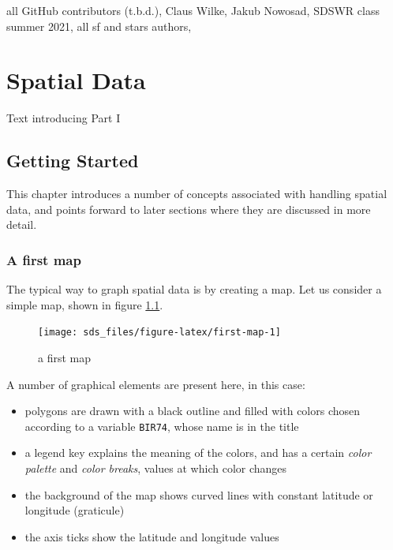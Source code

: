 \documentclass[]{book}
\providecommand{\tightlist}{%
  \setlength{\itemsep}{0pt}\setlength{\parskip}{0pt}}
\begin{document}
all GitHub contributors (t.b.d.),
Claus Wilke,
Jakub Nowosad,
SDSWR class summer 2021,
all sf and stars authors,

\hypertarget{part-spatial-data}{%
\part{Spatial Data}\label{part-spatial-data}}

Text introducing Part I

\hypertarget{intro}{%
\chapter{Getting Started}\label{intro}}

This chapter introduces a number of concepts associated with
handling spatial data, and points forward to later sections where
they are discussed in more detail.

\hypertarget{a-first-map}{%
\section{A first map}\label{a-first-map}}

The typical way to graph spatial data is by creating a map. Let us consider
a simple map, shown in figure \ref{fig:first-map}.

\begin{figure}

{\centering \texttt{[image: sds\_files/figure-latex/first-map-1]} 

}

\caption{a first map}\label{fig:first-map}
\end{figure}

A number of graphical elements are present here, in this case:

\begin{itemize}
\tightlist
\item
  polygons are drawn with a black outline and filled with colors chosen according to a variable \texttt{BIR74}, whose name is in the title
\item
  a legend key explains the meaning of the colors, and has a certain \emph{color palette} and \emph{color
  breaks}, values at which color changes
\item
  the background of the map shows curved lines with constant latitude or longitude (graticule)
\item
  the axis ticks show the latitude and longitude values
\end{itemize}
\end{document}
